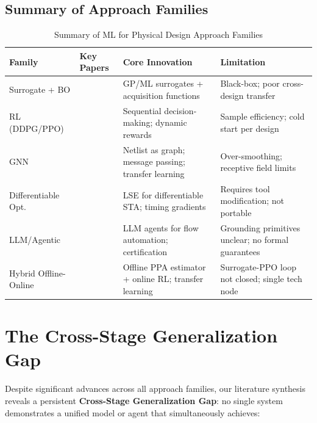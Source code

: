\documentclass[10pt,conference]{IEEEtran}
\begin{document}
\subsection{Summary of Approach Families}

\begin{table}[t]
\centering
\caption{Summary of ML for Physical Design Approach Families}
\label{tab:approach_families}
\begin{tabular}{@{}llll@{}}
\toprule
Family & Key Papers & Core Innovation & Limitation \\
\midrule
Surrogate + BO & \cite{kahng2018machine,huang2021machine,kahng2024solvers} & GP/ML surrogates + acquisition functions & Black-box; poor cross-design transfer \\
RL (DDPG/PPO) & \cite{mirhoseini2020chip,mutar2026auto,hsiao2026fasttuner} & Sequential decision-making; dynamic rewards & Sample efficiency; cold start per design \\
GNN & \cite{lu2022advancing,lu2023insta,chen2025graph} & Netlist as graph; message passing; transfer learning & Over-smoothing; receptive field limits \\
Differentiable Opt. & \cite{lu2023insta} & LSE for differentiable STA; timing gradients & Requires tool modification; not portable \\
LLM/Agentic & \cite{ghose2026agentic,jiang2026capo} & LLM agents for flow automation; certification & Grounding primitives unclear; no formal guarantees \\
Hybrid Offline-Online & \cite{hsiao2026fasttuner} & Offline PPA estimator + online RL; transfer learning & Surrogate-PPO loop not closed; single tech node \\
\bottomrule
\end{tabular}
\end{table}


\section{The Cross-Stage Generalization Gap}
\label{sec:gap}

Despite significant advances across all approach families, our literature synthesis reveals a persistent \textbf{Cross-Stage Generalization Gap}: no single system demonstrates a unified model or agent that simultaneously achieves:
\end{document}
